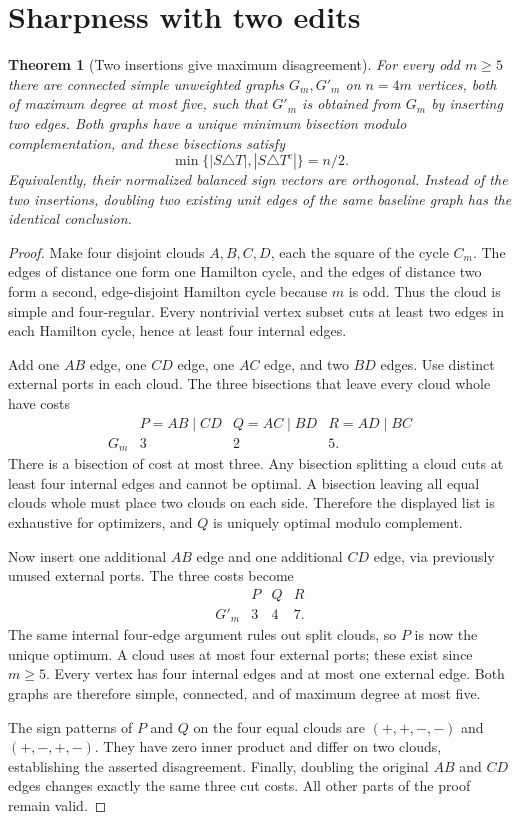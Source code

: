 \documentclass[11pt]{article}
\newtheorem{theorem}{Theorem}
\begin{document}
\section*{Sharpness with two edits}
\begin{theorem}[Two insertions give maximum disagreement]\label{thm:two}
For every odd $m\ge5$ there are connected simple unweighted graphs
$G_m,G'_m$ on $n=4m$ vertices, both of maximum degree at most five,
such that $G'_m$ is obtained from $G_m$ by inserting two edges. Both
graphs have a unique minimum bisection modulo complementation, and these
bisections satisfy
\[
 \min\{|S\triangle T|,|S\triangle T^c|\}=n/2.
\]
Equivalently, their normalized balanced sign vectors are orthogonal.
Instead of the two insertions, doubling two existing unit edges of the
same baseline graph has the identical conclusion.
\end{theorem}
\begin{proof}
Make four disjoint clouds $A,B,C,D$, each the square of the cycle $C_m$.
The edges of distance one form one Hamilton cycle, and the edges of
distance two form a second, edge-disjoint Hamilton cycle because $m$ is
odd. Thus the cloud is simple and four-regular. Every nontrivial vertex
subset cuts at least two edges in each Hamilton cycle, hence at least
four internal edges.

Add one $AB$ edge, one $CD$ edge, one $AC$ edge, and two $BD$ edges.
Use distinct external ports in each cloud. The three bisections that leave
every cloud whole have costs
\[
\begin{array}{c|ccc}
 &P=AB\mid CD&Q=AC\mid BD&R=AD\mid BC\\ \hline
G_m&3&2&5.
\end{array}
\]
There is a bisection of cost at most three. Any bisection splitting a
cloud cuts at least four internal edges and cannot be optimal. A
bisection leaving all equal clouds whole must place two clouds on each
side. Therefore the displayed list is exhaustive for optimizers, and
$Q$ is uniquely optimal modulo complement.

Now insert one additional $AB$ edge and one additional $CD$ edge, via
previously unused external ports. The three costs become
\[
\begin{array}{c|ccc}
 &P&Q&R\\ \hline
G'_m&3&4&7.
\end{array}
\]
The same internal four-edge argument rules out split clouds, so $P$ is
now the unique optimum. A cloud uses at most four external ports; these
exist since $m\ge5$. Every vertex has four internal edges and at most
one external edge. Both graphs are therefore simple, connected, and
of maximum degree at most five.

The sign patterns of $P$ and $Q$ on the four equal clouds are
$(+,+,-,-)$ and $(+,-,+,-)$. They have zero inner product and differ on
two clouds, establishing the asserted disagreement. Finally, doubling
the original $AB$ and $CD$ edges changes exactly the same three cut
costs. All other parts of the proof remain valid.
\end{proof}
\end{document}
